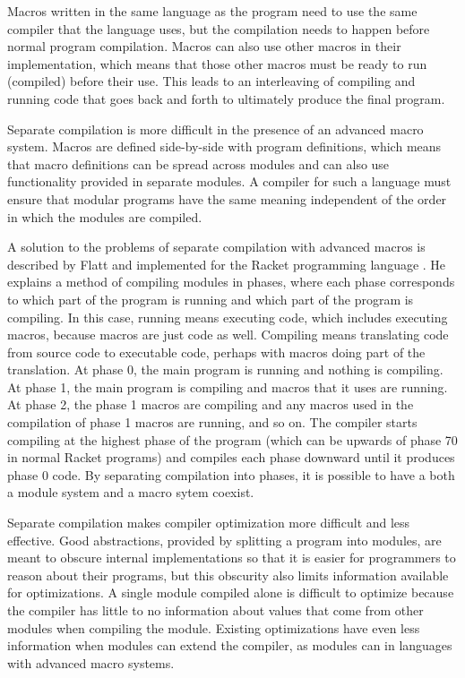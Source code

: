 Macros written in the same language as the program need to use the same compiler that the language uses, but the compilation needs to happen before normal program compilation.
Macros can also use other macros in their implementation, which means that those other macros must be ready to run (compiled) before their use.
This leads to an interleaving of compiling and running code that goes back and forth to ultimately produce the final program.

Separate compilation is more difficult in the presence of an advanced macro system.
Macros are defined side-by-side with program definitions, which means that macro definitions can be spread across modules and can also use functionality provided in separate modules.
A compiler for such a language must ensure that modular programs have the same meaning independent of the order in which the modules are compiled.

A solution to the problems of separate compilation with advanced macros is described by Flatt and implemented for the Racket programming language \cite{Flatt}.
He explains a method of compiling modules in phases, where each phase corresponds to which part of the program is running and which part of the program is compiling.
In this case, running means executing code, which includes executing macros, because macros are just code as well.
Compiling means translating code from source code to executable code, perhaps with macros doing part of the translation.
At phase 0, the main program is running and nothing is compiling.
At phase 1, the main program is compiling and macros that it uses are running.
At phase 2, the phase 1 macros are compiling and any macros used in the compilation of phase 1 macros are running, and so on.
The compiler starts compiling at the highest phase of the program (which can be upwards of phase 70 in normal Racket programs) and compiles each phase downward until it produces phase 0 code. 
By separating compilation into phases, it is possible to have a both a module system and a macro sytem coexist.

Separate compilation makes compiler optimization more difficult and less effective.
Good abstractions, provided by splitting a program into modules, are meant to obscure internal implementations so that it is easier for programmers to reason about their programs, but this obscurity also limits information available for optimizations. 
A single module compiled alone is difficult to optimize because the compiler has little to no information about values that come from other modules when compiling the module.
Existing optimizations have even less information when modules can extend the compiler, as modules can in languages with advanced macro systems. 

